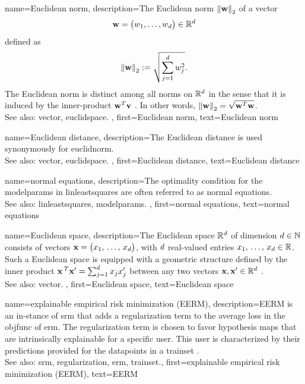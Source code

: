 {name={Euclidean norm}, 
	description={The 
		Euclidean norm $\left\Vert {{\bf w}} \right\Vert_{2}$ of a \gls{vector} 
		$${\bf w} = \big(w_{1},\ldots,w_{d} \big) \in
		\mathbb{R}^{d}$$
		defined as 
		$$\left\Vert {{\bf w}} \right\Vert_{2} := \sqrt{\sum_{j=1}^{d}w^2_{j}}.$$ 
		The Euclidean norm is distinct among all norms on $\mathbb{R}^{d}$ in the sense 
		that it is induced by the inner-product ${\bf w}^{T} {\bf v}$ \cite{RudinBook,HalmosFiniteDimVecSpace,BoydConvexBook}. 
		In other words, $\left\Vert {{\bf w}} \right\Vert_{2}= \sqrt{{\bf w}^{T} {\bf w}}$.	\\
		See also: \gls{vector}, \gls{euclidspace}. },
	first={Euclidean norm},
	text={Euclidean norm} 
}

{name={Euclidean distance}, 
	description={The Euclidean distance is used 
	synonymously for \gls{euclidnorm}.	\\
	See also: \gls{vector}, \gls{euclidspace}. },
	first={Euclidean distance},
	text={Euclidean distance} 
}

{name={normal equations}, 
	description={The optimality condition for the \glspl{modelparam} 
	in \gls{linleastsquares} are often referred to as normal equations.\\ 
	See also: \gls{linleastsquares}, \glspl{modelparam}. 
	},
	first={normal equations},
	text={normal equations} 
}


{name={Euclidean space}, 
	description={The 
		Euclidean space $\mathbb{R}^{d}$ of dimension $d \in \mathbb{N}$ consists 
		of \glspl{vector} ${\bf x}= \big(x_{1}, \,\ldots, \,x_{d}\big)$, with $d$ 
		real-valued entries $x_{1}, \,\ldots, \,x_{d} \in \mathbb{R}$. Such a Euclidean 
		space is equipped with a geometric structure defined by the inner product 
		${\bf x}\,^{T} {\bf x}' = \sum_{j=1}^{d} x_{j} x'_{j}$ 
		between any two \glspl{vector} ${\bf x},{\bf x}' \in \mathbb{R}^{d}$ \cite{RudinBookPrinciplesMatheAnalysis}.
		\\
		See also: \gls{vector}. },
	first={Euclidean space},
	text={Euclidean space} 
}

{name={explainable empirical risk minimization (EERM)}, 
	description={EERM is an 
		in-\linebreak stance of \gls{srm} that adds a \gls{regularization} term to the 
		average \gls{loss} in the \gls{objfunc} of \gls{erm}. 
		The \gls{regularization} term is chosen to favor \gls{hypothesis} \glspl{map} that are intrinsically 
		explainable for a specific user. This user is characterized by their \glspl{prediction} provided 
		for the \glspl{datapoint} in a \gls{trainset} \cite{Zhang:2024aa}.
				\\
		See also: \gls{srm}, \gls{regularization}, \gls{erm}, \gls{trainset}.},
	first={explainable empirical risk minimization (EERM)},
	text={EERM} 
}
	
